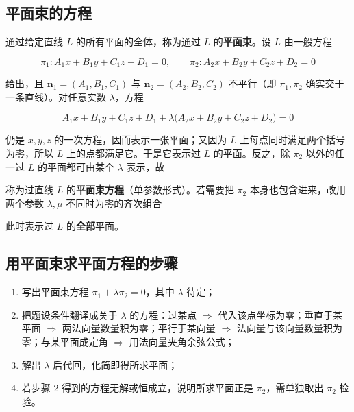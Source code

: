 \subsection{平面束的方程}

通过给定直线 $L$ 的所有平面的全体，称为通过 $L$ 的\textbf{平面束}。设 $L$ 由一般方程

\[
\pi_1:A_1x+B_1y+C_1z+D_1=0,\qquad
\pi_2:A_2x+B_2y+C_2z+D_2=0
\]

给出，且 $\boldsymbol{n}_1=(A_1,B_1,C_1)$ 与 $\boldsymbol{n}_2=(A_2,B_2,C_2)$ 不平行（即 $\pi_1,\pi_2$ 确实交于一条直线）。对任意实数 $\lambda$，方程

\[
A_1x+B_1y+C_1z+D_1+\lambda\bigl(A_2x+B_2y+C_2z+D_2\bigr)=0
\]

仍是 $x,y,z$ 的一次方程，因而表示一张平面；又因为 $L$ 上每点同时满足两个括号为零，所以 $L$ 上的点都满足它。于是它表示过 $L$ 的平面。反之，除 $\pi_2$ 以外的任一过 $L$ 的平面都可由某个 $\lambda$ 表示，故


称为过直线 $L$ 的\textbf{平面束方程}（单参数形式）。若需要把 $\pi_2$ 本身也包含进来，改用两个参数 $\lambda,\mu$ 不同时为零的齐次组合


此时表示过 $L$ 的\textbf{全部}平面。

\subsection{用平面束求平面方程的步骤}

\begin{enumerate}
\item 写出平面束方程 $\pi_1+\lambda\pi_2=0$，其中 $\lambda$ 待定；
\item 把题设条件翻译成关于 $\lambda$ 的方程：过某点 $\Rightarrow$ 代入该点坐标为零；垂直于某平面 $\Rightarrow$ 两法向量数量积为零；平行于某向量 $\Rightarrow$ 法向量与该向量数量积为零；与某平面成定角 $\Rightarrow$ 用法向量夹角余弦公式；
\item 解出 $\lambda$ 后代回，化简即得所求平面；
\item 若步骤 2 得到的方程无解或恒成立，说明所求平面正是 $\pi_2$，需单独取出 $\pi_2$ 检验。
\end{enumerate}



